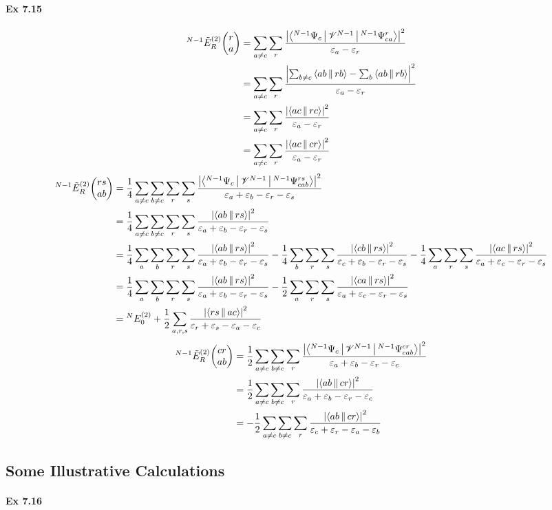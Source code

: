 \documentclass[a4paper]{article}
\newcommand{\ex}[1]{\paragraph{Ex #1}}
\numberwithin{equation}{subsection}
\begin{document}
\ex{7.15}
\begin{align}
{^{N-1}}\tilde{E}_R^{(2)}\mqty(r\\ a) 
&= \sum_{a\neq c}\sum_r \dfrac{\abs{
		\Braket{^{N-1}\Psi_c | \mathscr{V}^{N-1} | ^{N-1}\Psi_{ca}^r} 
	}^2	}{\varepsilon_a - \varepsilon_r} \notag\\
&= \sum_{a\neq c}\sum_r \dfrac{\abs{
		\sum_{b\neq c} \Braket{ab||rb} - \sum_b \Braket{ab||rb}
	}^2	}{\varepsilon_a - \varepsilon_r} \notag\\
&= \sum_{a\neq c}\sum_r \dfrac{\abs{\Braket{ac||rc}	}^2	}{\varepsilon_a - \varepsilon_r} \notag\\
&= \sum_{a\neq c}\sum_r \dfrac{\abs{\Braket{ac||cr}	}^2	}{\varepsilon_a - \varepsilon_r}
\end{align}
\begin{align}
{^{N-1}}\tilde{E}_R^{(2)}\mqty(rs\\ ab) 
&= \dfrac{1}{4}\sum_{a\neq c}\sum_{b\neq c}\sum_r\sum_s \dfrac{\abs{
		\Braket{^{N-1}\Psi_c | \mathscr{V}^{N-1} | ^{N-1}\Psi_{cab}^{rs}} 
	}^2	}{\varepsilon_a + \varepsilon_b - \varepsilon_r - \varepsilon_s} \notag\\
&= \dfrac{1}{4}\sum_{a\neq c}\sum_{b\neq c}\sum_r\sum_s \dfrac{\abs{
		\Braket{ab||rs}
	}^2	}{\varepsilon_a + \varepsilon_b - \varepsilon_r - \varepsilon_s} \\
&= \dfrac{1}{4}\sum_{a}\sum_{b}\sum_r\sum_s \dfrac{\abs{\Braket{ab||rs}}^2	}{\varepsilon_a + \varepsilon_b - \varepsilon_r - \varepsilon_s}
- \dfrac{1}{4}\sum_{b}\sum_r\sum_s \dfrac{\abs{\Braket{cb||rs}}^2	}{\varepsilon_c + \varepsilon_b - \varepsilon_r - \varepsilon_s}
- \dfrac{1}{4}\sum_{a}\sum_r\sum_s \dfrac{\abs{\Braket{ac||rs}}^2	}{\varepsilon_a + \varepsilon_c - \varepsilon_r - \varepsilon_s} \notag\\
&= \dfrac{1}{4}\sum_{a}\sum_{b}\sum_r\sum_s \dfrac{\abs{\Braket{ab||rs}}^2	}{\varepsilon_a + \varepsilon_b - \varepsilon_r - \varepsilon_s}
- \dfrac{1}{2}\sum_{a}\sum_r\sum_s \dfrac{\abs{\Braket{ca||rs}}^2	}{\varepsilon_a + \varepsilon_c - \varepsilon_r - \varepsilon_s} \notag\\
&= {^N}E_0^{(2)}
+ \dfrac{1}{2}\sum_{a,r,s} \dfrac{\abs{\Braket{rs||ac}}^2	}{\varepsilon_r + \varepsilon_s - \varepsilon_a - \varepsilon_c}
\end{align}
\begin{align}
{^{N-1}}\tilde{E}_R^{(2)}\mqty(cr\\ ab) 
&= \dfrac{1}{2}\sum_{a\neq c}\sum_{b\neq c}\sum_r \dfrac{\abs{
		\Braket{^{N-1}\Psi_c | \mathscr{V}^{N-1} | ^{N-1}\Psi_{cab}^{cr}} 
	}^2	}{\varepsilon_a + \varepsilon_b - \varepsilon_r - \varepsilon_c} \notag\\
&= \dfrac{1}{2}\sum_{a\neq c}\sum_{b\neq c}\sum_r \dfrac{\abs{
		\Braket{ab||cr} 
	}^2	}{\varepsilon_a + \varepsilon_b - \varepsilon_r - \varepsilon_c} \notag\\
&= -\dfrac{1}{2}\sum_{a\neq c}\sum_{b\neq c}\sum_r \dfrac{\abs{
		\Braket{ab||cr} 
	}^2	}{\varepsilon_c + \varepsilon_r - \varepsilon_a - \varepsilon_b} 
\end{align}

\subsection{Some Illustrative Calculations}
\ex{7.16}
\end{document}
